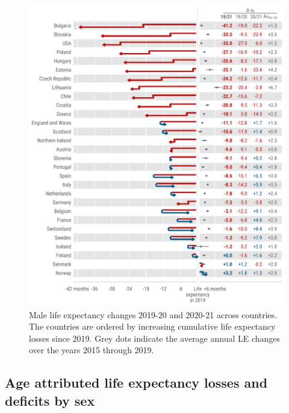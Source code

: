 \documentclass[12pt]{article}
\begin{document}
\begin{figure}[hb!]
    \centering
    \includegraphics{figure-a5.pdf}
    \caption{Male life expectancy changes 2019-20 and 2020-21 across countries. The countries are ordered by increasing cumulative life expectancy losses since 2019. Grey dots indicate the average annual LE changes over the years 2015 through 2019.}
    \label{fig:figure-a5}
\end{figure}

\clearpage

\subsection*{Age attributed life expectancy losses and deficits by sex}
\end{document}
